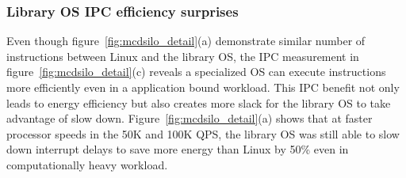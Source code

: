 \subsubsection{Library OS IPC efficiency surprises}
\label{sec:mcdsilo:ipc}
Even though figure~\ref{fig:mcdsilo_detail}(a) demonstrate similar number of instructions between Linux and the library OS, the IPC measurement in figure~\ref{fig:mcdsilo_detail}(c) reveals a specialized OS can execute instructions more efficiently even in a application bound workload. This IPC benefit not only leads to energy efficiency but also creates more slack for the library OS to take advantage of slow down. Figure~\ref{fig:mcdsilo_detail}(a) shows that at faster processor speeds in the 50K and 100K QPS, the library OS was still able to slow down interrupt delays to save more energy than Linux by 50\% even in computationally heavy workload.





